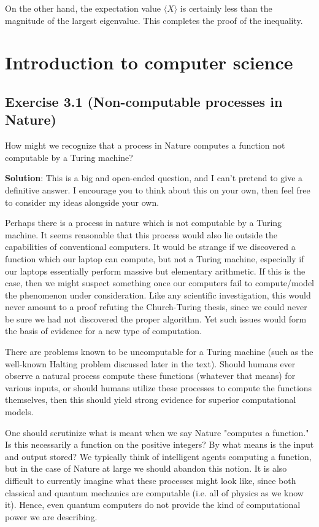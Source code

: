 \documentclass{book}
\begin{document}
    On the other hand, the expectation value $\langle X \rangle$ is certainly less than the magnitude of the largest eigenvalue. This completes the proof of the inequality.

\chapter{Introduction to computer science}

\section*{Exercise 3.1 (Non-computable processes in Nature)}
    How might we recognize that a process in Nature computes a function not computable by a Turing machine?

    \textbf{Solution}: This is a big and open-ended question, and I can't pretend to give a definitive answer. I encourage you to think about this on your own, then feel free to consider my ideas alongside your own.

    Perhaps there is a process in nature which is not computable by a Turing machine. It seems reasonable that this process would also lie outside the capabilities of conventional computers. It would be strange if we discovered a function which our laptop can compute, but not a Turing machine, especially if our laptops essentially perform massive but elementary arithmetic. If this is the case, then we might suspect something once our computers fail to compute/model the phenomenon under consideration. Like any scientific investigation, this would never amount to a proof refuting the Church-Turing thesis, since we could never be sure we had not discovered the proper algorithm. Yet such issues would form the basis of evidence for a new type of computation. 

    There are problems known to be uncomputable for a Turing machine (such as the well-known Halting problem discussed later in the text). Should humans ever observe a natural process compute these functions (whatever that means) for various inputs, or should humans utilize these processes to compute the functions themselves, then this should yield strong evidence for superior computational models.

    One should scrutinize what is meant when we say Nature "computes a function." Is this necessarily a function on the positive integers? By what means is the input and output stored? We typically think of intelligent agents computing a function, but in the case of Nature at large we should abandon this notion. It is also difficult to currently imagine what these processes might look like, since both classical and quantum mechanics are computable (i.e. all of physics as we know it). Hence, even quantum computers do not provide the kind of computational power we are describing. 
\end{document}
